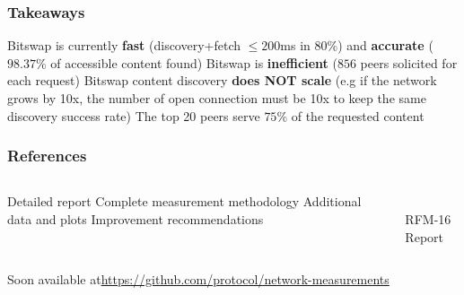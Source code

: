 \documentclass{pl-slide}
\begin{document}
\begin{frame}
\frametitle{Takeaways}
\begin{itemize}
	\itemc Bitswap is currently \textbf{fast} (discovery+fetch $\leq 200$ms in $80\%$) and \textbf{accurate} ($98.37\%$ of accessible content found)
	\itemc Bitswap is \textbf{inefficient} ($856$ peers solicited for each request)
	\itemc Bitswap content discovery \textbf{does NOT scale} (e.g if the network grows by 10x, the number of open connection must be 10x to keep the same discovery success rate)
	\itemc The top 20 peers serve $75\%$ of the requested content
\end{itemize}
\end{frame}

\begin{frame}
\frametitle{References}
\begin{columns}[onlytextwidth]
\begin{column}{0.60\textwidth}
\begin{itemize}
	\itemc Detailed report
	\itemc Complete measurement methodology
	\itemc Additional data and plots
	\itemc Improvement recommendations
\end{itemize}
\end{column}
\begin{column}{0.38\textwidth}
\begin{center}
\\
\medskip
RFM-16 Report
\bigskip
\end{center}
\end{column}
\end{columns}

\begin{itemize}
	\itemc Soon available at\hspace{.6em}\url{https://github.com/protocol/network-measurements}

\end{itemize}

\end{frame}
\end{document}
